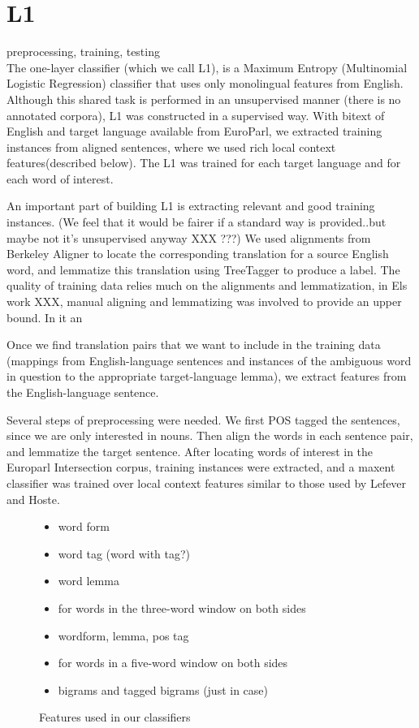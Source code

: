 \documentclass[11pt,letterpaper]{article}
\begin{document}
\section{L1}
preprocessing, training, testing\\

The one-layer classifier (which we call L1), is a Maximum Entropy (Multinomial Logistic Regression) classifier that uses only monolingual features from English.
Although this shared task is performed in an unsupervised manner (there is no annotated corpora), L1 was constructed in a supervised way.
With bitext of English and target language available from EuroParl, we extracted training instances from aligned sentences, where we used rich local context features(described below).
The L1 was trained for each target language and for each word of interest. 

An important part of building L1 is extracting relevant and good training instances. 
(We feel that it would be fairer if a standard way is provided..but maybe not it's unsupervised anyway XXX ???)
We used alignments from Berkeley Aligner to locate the corresponding translation for a source English word,
and lemmatize this translation using TreeTagger to produce a label.  
The quality of training data relies much on the alignments and lemmatization, in Els work XXX, manual aligning and lemmatizing was involved to provide an upper bound.
In it an  


Once we find translation pairs that we want to include in the training data
(mappings from English-language sentences and instances of the ambiguous word
in question to the appropriate target-language lemma), we extract features from
the English-language sentence. 

Several steps of preprocessing were needed. We first POS tagged the sentences,
since we are only interested in nouns.  Then align the words in each sentence
pair, and lemmatize the target sentence.  After locating words of interest in
the Europarl Intersection corpus, training instances were extracted, and a
maxent classifier was trained over local context features similar to those used
by Lefever and Hoste.

\begin{figure}
  \begin{itemize}
  \item word form
  \item word tag (word with tag?)
  \item word lemma
  \item for words in the three-word window on both sides
  \item wordform, lemma, pos tag
  \item for words in a five-word window on both sides
  \item bigrams and tagged bigrams (just in case)
  \end{itemize}
  \label{features}
  \caption{Features used in our classifiers}
\end{figure}
\end{document}
